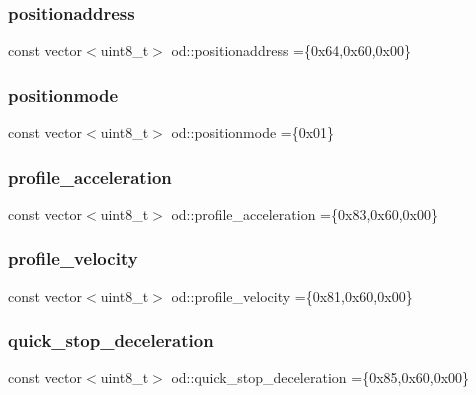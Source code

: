 \subsubsection{\texorpdfstring{positionaddress}{positionaddress}}
{\footnotesize\ttfamily const vector$<$uint8\+\_\+t$>$ od\+::positionaddress =\{0x64,0x60,0x00\}}

\mbox{\label{namespaceod_a85efca0656a6714d7227858e112c4a73}} 
\subsubsection{\texorpdfstring{positionmode}{positionmode}}
{\footnotesize\ttfamily const vector$<$uint8\+\_\+t$>$ od\+::positionmode =\{0x01\}}

\mbox{\label{namespaceod_aced8c17d62c0e774949057de0a99f402}} 
\subsubsection{\texorpdfstring{profile\+\_\+acceleration}{profile\_acceleration}}
{\footnotesize\ttfamily const vector$<$uint8\+\_\+t$>$ od\+::profile\+\_\+acceleration =\{0x83,0x60,0x00\}}

\mbox{\label{namespaceod_a47b7c8f6797cc134be5ee1d78d83ee50}} 
\subsubsection{\texorpdfstring{profile\+\_\+velocity}{profile\_velocity}}
{\footnotesize\ttfamily const vector$<$uint8\+\_\+t$>$ od\+::profile\+\_\+velocity =\{0x81,0x60,0x00\}}

\mbox{\label{namespaceod_a57361a1a6b60fd8b93c2828fd7f5429f}} 
\subsubsection{\texorpdfstring{quick\+\_\+stop\+\_\+deceleration}{quick\_stop\_deceleration}}
{\footnotesize\ttfamily const vector$<$uint8\+\_\+t$>$ od\+::quick\+\_\+stop\+\_\+deceleration =\{0x85,0x60,0x00\}}

